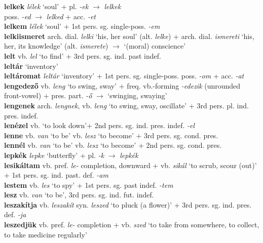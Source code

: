 \documentclass[11pt]{article}
\begin{document}
\textbf{lelkek} \emph{lélek} `soul' + pl. \emph{-ek} $\rightarrow$ \emph{lelkek} \\
poss. \emph{-ed} $\rightarrow$ \emph{lelked} + acc. \emph{-et} \\
\textbf{lelkem} \emph{lélek} `soul' + 1st pers. sg. single\hyp{}poss. \emph{-em} \\
\textbf{lelkiismeret} arch. dial. \emph{lelki} `his, her soul'
(alt. \emph{lelke}) + arch. dial. \emph{ismereti} `his, her, its
knowledge' (alt. \emph{ismerete}) $\rightarrow$ `(moral)
conscience' \\
\textbf{lelt} vb. \emph{lel} `to find' + 3rd pers. sg. ind. past indef. \\
\textbf{leltár} `inventory' \\
\textbf{leltáromat} \emph{leltár} `inventory' + 1st
pers. sg. single\hyp{}poss. poss. \emph{-om} + acc. \emph{-at} \\
\textbf{lengedező} vb. \emph{leng} `to swing, sway' +
freq. vb.\hyp{}forming \emph{-edezik} (unrounded front\hyp{}vowel) +
pres. part. \emph{-ő} $\rightarrow$ `swinging, swaying' \\
\textbf{lengenek} arch. \emph{lengnek}, vb. \emph{leng} `to swing,
sway, oscillate' + 3rd pers. pl. ind. pres. indef. \\
\textbf{lenézel} vb. `to look down'+ 2nd
pers. sg. ind. pres. indef. \emph{-el} \\
\textbf{lenne} vb. \emph{van} `to be' \textbar\textbar{}
vb. \emph{lesz} `to become' + 3rd pers. sg. cond. pres. \\
\textbf{lennél} vb. \emph{van} `to be' \textbar\textbar{}
vb. \emph{lesz} `to become' + 2nd pers. sg. cond. pres. \\
\textbf{lepkék} \emph{lepke} `butterfly' + pl. \emph{-k}
$\rightarrow$ \emph{lepkék} \\
\textbf{lesikáltam} vb. pref. \emph{le-} completion, downward +
vb. \emph{sikál} `to scrub, scour (out)' + 1st pers. sg. ind. past. def.
\emph{-am} \\
\textbf{lestem} vb. \emph{les} `to spy' + 1st pers. sg. past
indef. \emph{-tem} \\
\textbf{lesz} vb. \emph{van} `to be', 3rd
pers. sg. ind. fut. indef. \\
\textbf{leszakítja} vb. \emph{leszakít} syn. \emph{leszed} `to pluck (a flower)' + 3rd
pers. sg. ind. pres. def. \emph{-ja}  \\
\textbf{leszedjük} vb. pref. \emph{le-} completion + vb. \emph{szed}
`to take from somewhere, to collect, to take medicine regularly'
\end{document}
